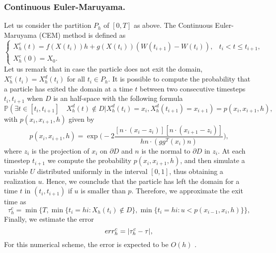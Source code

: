 \subsubsection{Continuous Euler-Maruyama. }
Let us consider the partition $P_h$ of $[0,T]$ as above. The Continuous Euler-Maruyama (CEM) method is defined as
\begin{equation}\label{eq:CEM}
	\begin{cases}
		X_h^c(t) = f(X(t_i))h + g(X(t_i))(W(t_{i+1}) - W(t_{i})),  & t_i < t \leq t_{i+1},\\
		X_h^c(0) = X_0.
	\end{cases}
\end{equation} 
Let us remark that in case the particle does not exit the domain, $X_h^c(t_i) = X_h^d(t_i)$ for all $t_i \in P_h$. It is possible to compute the probability that a particle has exited the domain at a time $t$ between two consecutive timesteps $t_i,t_{i+1}$ when $D$ is an half-space with the following formula \cite{Gobet2001}
\begin{equation}\label{eq:CEMProb}
	\mathbb{P} (\exists t \in [ t_i,t_{i+1} ] \quad X_h^d(t) \notin D | X_h^d(t_i) = x_i, X_h^d(t_{i+1}) = x_{i+1}) = p(x_i,x_{i+1},h),
\end{equation}
with $p(x_i,x_{i+1},h)$ given by
\begin{equation}\label{eq:CEMProbHalfSpace}
	p(x_i,x_{i+1},h) = \exp\Big(-2\frac{[n\cdot(x_i - z_i)][n\cdot(x_{i+1} - z_i)]}{hn\cdot (gg^T(x_i)n)}\Big),
\end{equation}
where $z_i$ is the projection of $x_i$ on $\partial D$ and $n$ is the normal to $\partial D$ in $z_i$. At each timestep $t_{i+1}$ we compute the probability $p(x_i,x_{i+1},h)$, and then simulate a variable $U$ distributed uniformly in the interval $\left[0,1\right]$, thus obtaining a realization $u$. Hence, we counclude that the particle has left the domain for a time $t$ in $(t_i,t_{i+1})$ if $u$ is smaller than $p$. Therefore, we approximate the exit time as
\begin{equation}\label{eq:TauCEM}
	\tau_h^c = \min \{T,\min\{t_i = hi \colon X_h(t_i) \notin D\}, \min\{t_i = hi \colon u < p(x_{i-1},x_i,h) \}\},
\end{equation}
Finally, we estimate the error 
\begin{equation}\label{eq:ErrCEM}
	err_h^c = | \tau_h^c - \tau |, \\
\end{equation}
For this numerical scheme, the error is expected to be $O(h)$ \cite{Gobet2001}. 

